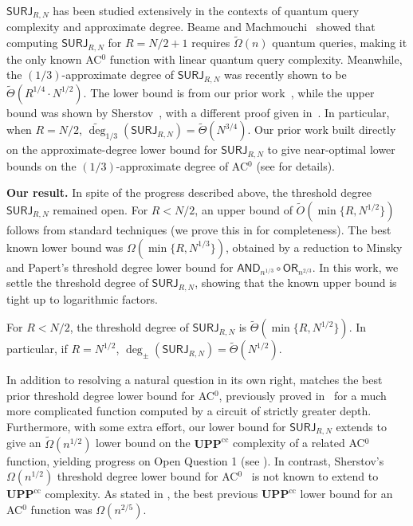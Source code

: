\documentclass{toc}
\newcommand{\SURJ}{\mathsf{ SURJ}}
\newcommand{\OR}{\mathsf{ OR}}
\newcommand{\UPP}{\mathbf{UPP}}
\newcommand{\adeg}{\widetilde{\operatorname{deg}}}
\newcommand{\AND}{\mathsf{AND}}
\begin{document}
$\SURJ_{R, N}$ has been studied extensively in the contexts of quantum query complexity and approximate degree. Beame and Machmouchi~\cite{beame} showed that computing $\SURJ_{R, N}$ for $R = N/2 + 1$ requires $\tilde{\Omega}(n)$ quantum queries, making it the only known AC$^0$ function with  linear quantum query complexity. Meanwhile,
the $(1/3)$-approximate degree of $\SURJ_{R, N}$ was recently shown to be $\tilde{\Theta}(R^{1/4} \cdot N^{1/2})$. The lower
bound is from our prior work~\cite{bkt}, while the upper bound
was shown by Sherstov~\cite{algopoly}, with a different proof given in~\cite{bkt}. 
In particular, when $R=N/2$, $\adeg_{1/3}(\SURJ_{R, N}) = \tilde{\Theta}(N^{3/4})$. 
Our prior %
work  %
\cite{adegsurj, bkt} built directly on the
%
approximate-degree %
lower bound for $\SURJ_{R, N}$ to 
give near-optimal lower bounds on the $(1/3)$-approximate degree of AC$^0$ (see  for details).

\medskip \noindent \textbf{Our result.} 
In spite of the progress described above, the  threshold degree $\SURJ_{R, N}$
remained open. For $R < N/2$, an upper bound of $\tilde{O}(\min\{R, N^{1/2}\})$ follows from standard techniques (we prove
this in  for completeness). The best known lower bound was $\Omega(\min\{R, N^{1/3}\})$, obtained by a reduction
to Minsky and Papert's threshold degree lower bound for $\AND_{n^{1/3}} \circ \OR_{n^{2/3}}$.
In this work, we settle the threshold degree of $\SURJ_{R, N}$, showing that the known upper bound is tight up to logarithmic
factors.

\begin{theorem} \label{thm:surj}
	For $R < N/2$, the threshold degree of $\SURJ_{R, N}$ is
	$\tilde{\Theta}(\min\{R, N^{1/2}\})$. In particular, if $R=N^{1/2}$, $\deg_{\pm}(\SURJ_{R, N}) = \tilde{\Theta}(N^{1/2})$. 
\end{theorem}

In addition to  
resolving a natural question in its own right,  matches the best prior threshold degree lower bound for AC$^0$,
previously proved in~\cite{sherstov15} for a much more complicated  function computed by a circuit of strictly greater depth. 
Furthermore, with some extra effort, our lower bound for $\SURJ_{R, N}$ extends to give an $\tilde{\Omega}(n^{1/2})$ lower
bound on the $\UPP^{\text{cc}}$ complexity of a related AC$^0$ function, yielding progress on Open Question 1
%
(see ).   %
In contrast, Sherstov's  $\Omega(n^{1/2})$ threshold degree lower bound
for AC$^0$~\cite{sherstov15} is not known to extend to $\UPP^{\text{cc}}$ complexity. As stated in , the best previous $\UPP^{\text{cc}}$ lower bound for an AC$^0$ function was $\Omega(n^{2/5})$.
\end{document}
